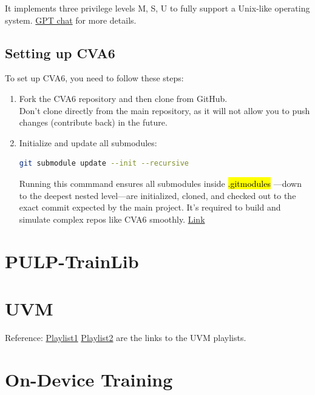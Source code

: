 \documentclass[12pt, a4paper]{article}
\begin{document}
\vspace{0.5em}

It implements three privilege levels M, S, U to fully support a Unix-like operating system.
\href{https://chatgpt.com/s/t_6859b8e04be88191863e1d50b57d0f11}{GPT chat} for more details.

\subsection{Setting up CVA6}

To set up CVA6, you need to follow these steps:
\begin{enumerate}
    \item Fork the CVA6 repository and then clone from GitHub. \\
    Don't clone directly from the main repository, as it will not allow you to push changes (contribute back) in the future.

    \item Initialize and update all submodules:
        \begin{lstlisting}[language=bash, frame=single, basicstyle=\ttfamily\footnotesize]
    git submodule update --init --recursive
        \end{lstlisting}

        Running this commmand ensures all submodules inside \hl{.gitmodules} —down to the deepest nested level—are initialized, cloned, and checked out to the exact commit expected by the main project. It's required to build and simulate complex repos like CVA6 smoothly. \href{https://chatgpt.com/s/t_6859c638d5208191bfd8707c9580f31a}{Link}
        
\end{enumerate}



\section{PULP-TrainLib}

\section{UVM}
Reference: \href{https://youtube.com/playlist?list=PLuYB6t6povcLgoHWLJgk-VeMQ0Rscjw03&si=l-rjyvLkuttomYeC}{Playlist1}
\href{https://youtube.com/playlist?list=PLqPfWwayuBvNrr09dCweog1htCBLUbN4W&si=4vI1Fs_sgz-A0wXdC}{Playlist2} are the links to the UVM playlists.

\section{On-Device Training}
\end{document}
